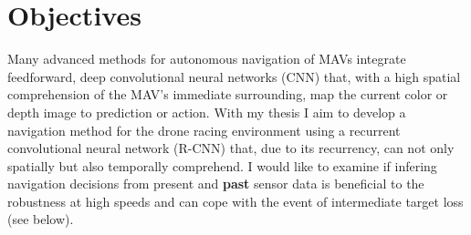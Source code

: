 \chapter{Objectives}\label{cha:objectives}

Many advanced methods for autonomous navigation of MAVs
integrate feedforward, deep convolutional neural networks (CNN)
that, with a high spatial comprehension of the MAV's immediate surrounding, 
map the current color or depth image to prediction or action.
With my thesis I aim to develop a navigation method for the drone racing environment
using a recurrent convolutional neural network (R-CNN)
that, due to its recurrency, can not only spatially but also temporally comprehend.
I would like to examine if infering navigation decisions from present and \textbf{past} sensor data
is beneficial to the robustness at high speeds and can cope with the event of intermediate target loss (see below).

